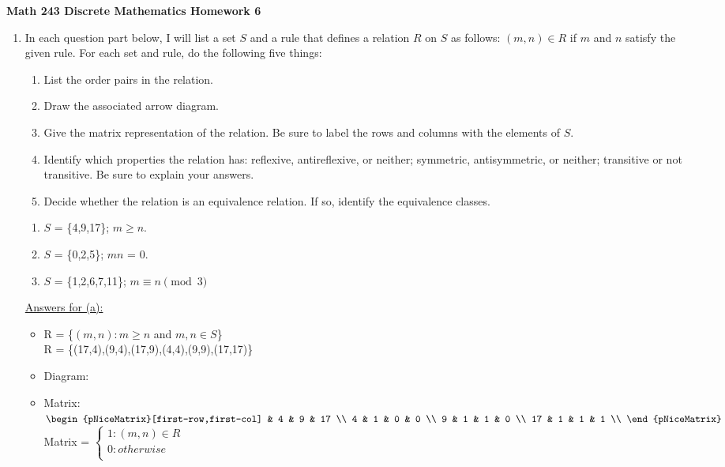 \documentclass{article}
\newcommand{\R}{\mathbb{R}}
\begin{document}
\noindent\textbf{Math 243 Discrete Mathematics \hfill Homework 6}

\begin{enumerate}
    \item In each question part below, I will list a set $\mathit{S}$ and 
    a rule that defines a relation $\mathit{R}$ on $\mathit{S}$ as follows: 
    $(\mathit{m,n}) \in R$ if $\mathit{m}$ and $\mathit{n}$ satisfy the given rule. 
    For each set and rule, do the following five things: 
\begin{enumerate}[label=\bfseries \roman*]
\item List the order pairs in the relation.
\item Draw the associated arrow diagram.
\item Give the matrix representation of the relation. 
Be sure to label the rows and columns with the elements of $S$.
\item Identify which properties the relation has: reflexive, 
antireflexive, or neither; symmetric, antisymmetric, or neither; 
transitive or not transitive. Be sure to explain your answers.
\item Decide whether the relation is an equivalence relation. 
If so, identify the equivalence classes.     
\end{enumerate}

\begin{enumerate}
    \item $\mathit{S}$ = \{4,9,17\}; $m \geq n$.    
    \item $\mathit{S}$ = \{0,2,5\}; $mn$ = 0.
    \item $\mathit{S}$ = \{1,2,6,7,11\}; $m \equiv n \pmod{3}$
\end{enumerate}
\underline{Answers for (a):}    

\begin{itemize}
    \item R = \{$(m,n):m \geq n$ and $m,n \in S$\}
    \\R = \{(17,4),(9,4),(17,9),(4,4),(9,9),(17,17)\}\\

    \item Diagram:\\

    \item Matrix:\\
        $\begin{pNiceMatrix}[first-row,first-col]
        & 4 & 9 & 17       \\
        4  & 1 & 0 & 0        \\ 
        9  & 1 & 1 & 0        \\
        17 & 1 & 1 & 1        \\
        \end{pNiceMatrix}$
        \hspace{1cm} Matrix = 
        $\begin{cases}
            1: (m,n)\in R\\
            0: otherwise\\  
        \end{cases}$ \\
    

\end{itemize}
\end{enumerate}
\end{document}
